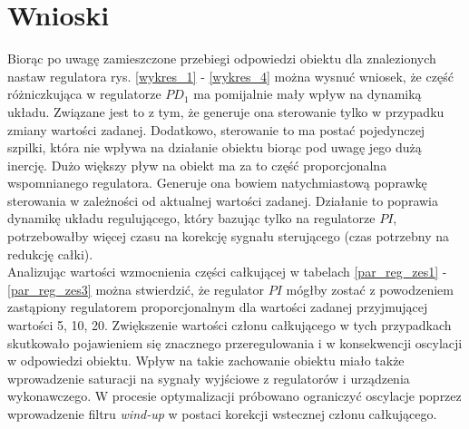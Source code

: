 \chapter{Wnioski}

Biorąc po uwagę zamieszczone przebiegi odpowiedzi obiektu dla znalezionych nastaw regulatora rys. \ref{wykres_1} - \ref{wykres_4} można wysnuć wniosek, że część różniczkująca w regulatorze $PD_1$ ma pomijalnie mały wpływ na dynamiką układu. Związane jest to z tym, że generuje ona sterowanie tylko w przypadku zmiany wartości zadanej. Dodatkowo, sterowanie to ma postać pojedynczej szpilki, która nie wpływa na działanie obiektu biorąc pod uwagę jego dużą inercję. Dużo większy pływ na obiekt ma za to część proporcjonalna wspomnianego regulatora. Generuje ona bowiem natychmiastową poprawkę sterowania w zależności od aktualnej wartości zadanej. Działanie to poprawia dynamikę układu regulującego, który bazując tylko na regulatorze $PI$, potrzebowałby więcej czasu na korekcję sygnału sterującego (czas potrzebny na redukcję całki). \\   
Analizując wartości wzmocnienia części całkującej w tabelach \ref{par_reg_zes1} - \ref{par_reg_zes3} można stwierdzić, że regulator $PI$ mógłby zostać z powodzeniem zastąpiony regulatorem proporcjonalnym dla wartości zadanej przyjmującej wartości 5, 10, 20.  Zwiększenie wartości członu całkującego w tych przypadkach skutkowało pojawieniem się znacznego przeregulowania i w konsekwencji oscylacji w odpowiedzi obiektu. Wpływ na takie zachowanie obiektu miało także wprowadzenie saturacji na sygnały wyjściowe z regulatorów i urządzenia wykonawczego. W procesie optymalizacji próbowano ograniczyć oscylacje poprzez wprowadzenie filtru \textit{wind-up} w postaci korekcji wstecznej członu całkującego. \\ 
